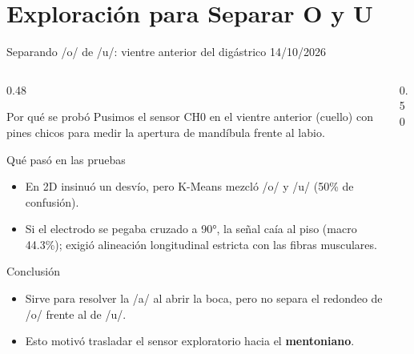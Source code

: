 \documentclass[aspectratio=169,10pt]{beamer}
\begin{document}
\section{Exploración para Separar O y U}

\begin{frame}{Separando /o/ de /u/: vientre anterior del digástrico \hfill \textnormal{\footnotesize 14/10/2026}}
    \begin{columns}[c]
        \begin{column}{0.48\textwidth}
            \footnotesize
            \begin{block}{Por qué se probó}
                Pusimos el sensor CH0 en el vientre anterior (cuello) con pines chicos para medir la apertura de mandíbula frente al labio.
            \end{block}
            \vspace{0.04cm}
            \begin{block}{Qué pasó en las pruebas}
                \begin{itemize}
                    \item En 2D insinuó un desvío, pero K-Means mezcló /o/ y /u/ (50\% de confusión).
                    \item Si el electrodo se pegaba cruzado a 90°, la señal caía al piso (macro 44.3\%); exigió alineación longitudinal estricta con las fibras musculares.
                \end{itemize}
            \end{block}
            \vspace{0.04cm}
            \begin{block}{Conclusión}
                \begin{itemize}
                    \item Sirve para resolver la /a/ al abrir la boca, pero no separa el redondeo de /o/ frente al de /u/.
                    \item Esto motivó trasladar el sensor exploratorio hacia el \textbf{mentoniano}.
                \end{itemize}
            \end{block}
        \end{column}
        \begin{column}{0.50\textwidth}

\end{column}
\end{columns}
\end{frame}
\end{document}
